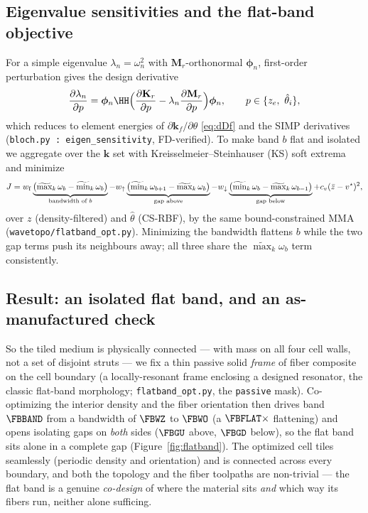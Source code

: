 \documentclass[11pt]{article}
\begin{document}
\subsection{Eigenvalue sensitivities and the flat-band objective}
For a simple eigenvalue $\lambda_n=\omega_n^2$ with $\mathbf M_r$-orthonormal
$\bm\phi_n$, first-order perturbation gives the design derivative
\begin{equation}
  \frac{\partial\lambda_n}{\partial p}
  =\bm\phi_n\HH\Bigl(\frac{\partial\mathbf K_r}{\partial p}
  -\lambda_n\frac{\partial\mathbf M_r}{\partial p}\Bigr)\bm\phi_n,
  \qquad p\in\{z_e,\ \hat\theta_i\},
  \label{eq:eigsens}
\end{equation}
which reduces to element energies of $\partial\mathbf k_f/\partial\theta$
\eqref{eq:dDf} and the SIMP derivatives (\texttt{bloch.py : eigen\_sensitivity},
FD-verified). To make band $b$ flat and isolated we aggregate over the $\mathbf k$
set with Kreisselmeier--Steinhauser (KS) soft extrema and minimize
\begin{equation}
  J=w_{\rm f}\underbrace{\bigl(\widetilde{\max}_k\,\omega_b
  -\widetilde{\min}_k\,\omega_b\bigr)}_{\text{bandwidth of }b}
  -w_{\uparrow}\underbrace{\bigl(\widetilde{\min}_k\,\omega_{b+1}
  -\widetilde{\max}_k\,\omega_b\bigr)}_{\text{gap above}}
  -w_{\downarrow}\underbrace{\bigl(\widetilde{\min}_k\,\omega_b
  -\widetilde{\max}_k\,\omega_{b-1}\bigr)}_{\text{gap below}}
  +c_v(\bar z-v^\star)^2,
  \label{eq:flatobj}
\end{equation}
over $z$ (density-filtered) and $\hat\theta$ (CS-RBF), by the same bound-constrained
MMA (\texttt{wavetopo/flatband\_opt.py}). Minimizing the bandwidth flattens $b$
while the two gap terms push its neighbours away; all three share the
$\widetilde{\max}_k\omega_b$ term consistently.

\subsection{Result: an isolated flat band, and an as-manufactured check}
So the tiled medium is physically connected --- with mass on all four cell walls,
not a set of disjoint struts --- we fix a thin passive solid \emph{frame} of fiber
composite on the cell boundary (a locally-resonant frame enclosing a designed
resonator, the classic flat-band morphology; \texttt{flatband\_opt.py}, the
\texttt{passive} mask). Co-optimizing the interior density and the fiber orientation
then drives band $\FBBAND$ from a bandwidth of $\FBWZ$ to $\FBWO$ (a $\FBFLAT\times$
flattening) and opens isolating gaps on \emph{both} sides ($\FBGU$ above, $\FBGD$
below), so the flat band sits alone in a complete gap
(Figure~\ref{fig:flatband}). The optimized cell tiles seamlessly (periodic density
and orientation) and is connected across every boundary, and both the topology and
the fiber toolpaths are non-trivial --- the flat band is a genuine \emph{co-design}
of where the material sits \emph{and} which way its fibers run, neither alone
sufficing.
\end{document}
